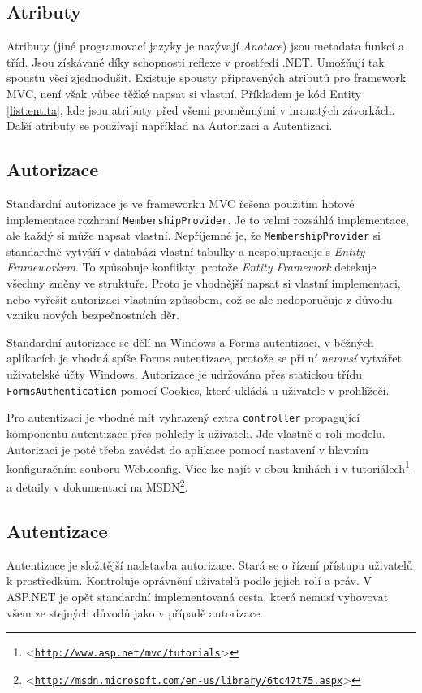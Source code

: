\documentclass[11pt,twoside,a4paper]{book}
\let\oldUrl\url
\renewcommand\url[1]{<\texttt{\oldUrl{#1}}>}
\begin{document}
\subsection{Atributy}
\label{sec:atributy}
Atributy (jiné programovací jazyky je nazývají \textit{Anotace}) jsou metadata funkcí a tříd. Jsou získávané díky schopnosti reflexe v prostředí .NET. Umožňují tak spoustu věcí zjednodušit. Existuje spousty připravených atributů pro framework MVC, není však vůbec těžké napsat si vlastní. Příkladem je kód Entity \ref{list:entita}, kde jsou atributy před všemi proměnnými v hranatých závorkách. Další atributy se používají například na \textsf{Autorizaci} a \textsf{Autentizaci}.


\subsection{Autorizace}
Standardní autorizace je ve frameworku MVC řešena použitím hotové implementace rozhraní \texttt{MembershipProvider}. Je to velmi rozsáhlá implementace, ale každý si může napsat vlastní.
Nepříjemné je, že \texttt{MembershipProvider} si standardně vytváří v databázi vlastní tabulky a nespolupracuje s \textit{Entity Frameworkem}. To způsobuje konflikty, protože \textit{Entity Framework} detekuje všechny změny ve struktuře. Proto je vhodnější napsat si vlastní implementaci, nebo vyřešit autorizaci vlastním způsobem, což se ale nedoporučuje z důvodu vzniku nových bezpečnostních děr.

Standardní autorizace se dělí na \textsf{Windows} a \textsf{Forms} autentizaci, v běžných aplikacích je vhodná spíše \textsf{Forms} autentizace, protože se při ní \textit{nemusí} vytvářet uživatelské účty Windows. Autorizace je udržována přes statickou třídu \texttt{FormsAuthentication} pomocí Cookies, které ukládá u uživatele v prohlížeči.

Pro autentizaci je vhodné mít vyhrazený extra \texttt{controller} propagující komponentu autentizace přes \textsf{pohledy} k uživateli. Jde vlastně o roli \textsf{modelu}. Autorizaci je poté třeba zavédst do aplikace pomocí nastavení v hlavním konfiguračním souboru \textsf{Web.config}. Více lze najít v obou knihách \cite{MVC1} \cite{MVC2} i v tutoriálech\footnote{\url{http://www.asp.net/mvc/tutorials}} a detaily v dokumentaci na MSDN\footnote{\url{http://msdn.microsoft.com/en-us/library/6tc47t75.aspx}}.

\subsection{Autentizace}
Autentizace je složitější nadstavba autorizace. Stará se o řízení přístupu uživatelů k prostředkům. Kontroluje oprávnění uživatelů podle jejich rolí a práv. V ASP.NET je opět standardní implementovaná cesta, která nemusí vyhovovat všem ze stejných důvodů jako v případě autorizace.
\end{document}

